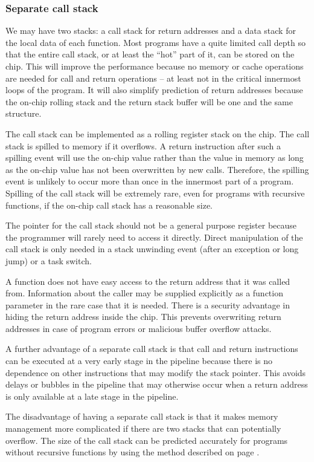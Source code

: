 \documentclass[forwardcom.tex]{subfiles}
\begin{document}
\subsubsection{Separate call stack} \label{dualStack}
We may have two stacks: 
a call stack for return addresses and a data stack for the local data of each function. Most programs have a quite limited call depth so that the entire call stack, or at least the ``hot'' part of it, can be stored on the chip. This will improve the performance because no memory or cache operations are needed for call and return operations -- at least not in the critical innermost loops of the program. It will also simplify prediction of return addresses because the on-chip rolling stack and the return stack buffer will be one and the same structure.
\vv

The call stack can be implemented as a rolling register stack on the chip. The call stack is spilled to memory if it overflows. A return instruction after such a spilling event will use the on-chip value rather than the value in memory as long as the on-chip value has not been overwritten by new calls. Therefore, the spilling event is unlikely to occur more than once in the innermost part of a program. 
Spilling of the call stack will be extremely rare, even for programs with recursive functions, if the on-chip call stack has a reasonable size.
\vv

The pointer for the call stack should not be a general purpose register because the programmer will rarely need to access it directly. Direct manipulation of the call stack is only needed in a stack unwinding event (after an exception or long jump) or a task switch.
\vv

A function does not have easy access to the return address that it was called from. Information about the caller may be supplied explicitly as a function parameter in the rare case that it is needed. There is a security advantage in hiding the return address inside the chip. This prevents overwriting return addresses in case of program errors or malicious buffer overflow attacks.
\vv

A further advantage of a separate call stack is that call and return instructions can be executed at a very early stage in the pipeline because there is no dependence on other instructions that may modify the stack pointer. This avoids delays or bubbles in the pipeline that may otherwise occur when a return address is only available at a late stage in the pipeline.
\vv

The disadvantage of having a separate call stack is that it makes memory management more complicated if there are two stacks that can potentially overflow. The size of the call stack can be predicted accurately for programs without recursive functions by using the method described on page \pageref{predictingStackSize}.
\vv
\end{document}
